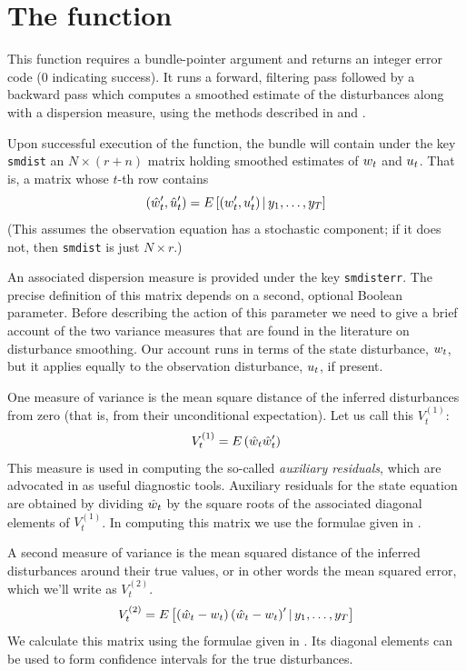 \section{The  function}
\label{sec:kdsmooth}

This function requires a bundle-pointer argument and returns an
integer error code (0 indicating success).  It runs a forward,
filtering pass followed by a backward pass which computes a smoothed
estimate of the disturbances along with a dispersion measure, using
the methods described in \cite{koopman93} and \cite{koopman-etal99}.

Upon successful execution of the function, the bundle will contain
under the key \texttt{smdist} an $N \times (r+n)$ matrix holding
smoothed estimates of $w_t$ and $u_t$. That is, a matrix
whose $t$-th row contains
\[
(\hat{w}_t' , \hat{u}_t')
 = E\left[ (w_t' , u_t') \,| \,
   y_1, \ldots, y_T \right]
\]
(This assumes the observation equation has a stochastic component; if
it does not, then \texttt{smdist} is just $N \times r$.)

An associated dispersion measure is provided under the key
\texttt{smdisterr}. The precise definition of this matrix depends on a
second, optional Boolean parameter. Before describing the action of
this parameter we need to give a brief account of the two variance
measures that are found in the literature on disturbance
smoothing. Our account runs in terms of the state disturbance,
$w_t$, but it applies equally to the observation disturbance,
$u_t$, if present.

One measure of variance is the mean square distance of the inferred
disturbances from zero (that is, from their unconditional
expectation). Let us call this $V^{(1)}_t$:
\[
V^{(1)}_t = E\left(\hat{w}_t\hat{w}_t'\right)
\]
This measure is used in computing the so-called \emph{auxiliary
  residuals}, which are advocated in \cite{durbin-koopman12} as useful
diagnostic tools. Auxiliary residuals for the state equation are
obtained by dividing $\hat{w}_t$ by the square roots of the
associated diagonal elements of $V^{(1)}_t$. In computing this matrix
we use the formulae given in \citet[section 4.4]{koopman-etal99}.

A second measure of variance is the mean squared distance of the
inferred disturbances around their true values, or in other words the
mean squared error, which we'll write as $V^{(2)}_t$.
\[
V^{(2)}_t = E\left[\left(\hat{w}_t - w_t\right)
  \left(\hat{w}_t - w_t\right)'
  | \,y_1, \ldots, y_T \right]
\]
We calculate this matrix using the formulae given in \citet[section
4.5.2]{durbin-koopman12}. Its diagonal elements can be used to form
confidence intervals for the true disturbances.

